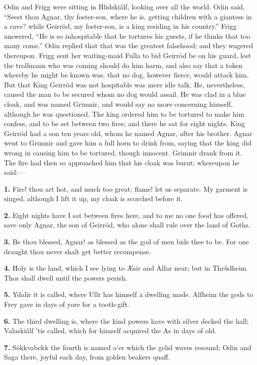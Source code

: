 Odin and Frigg were sitting in Hlidskiâlf, looking over all the world.
Odin said, ``Seest thou Agnar, thy foster-son, where he is, getting
children with a giantess in a cave? while Geirröd, my foster-son, is a
king residing in his country.'' Frigg answered, ``He is so inhospitable
that he tortures his guests, if he thinks that too many come.'' Odin
replied that that was the greatest falsehood; and they wagered
thereupon. Frigg sent her waiting-maid Fulla to bid Geirröd be on his
guard, lest the trollmann who was coming should do him harm, and also
say that a token whereby he might be known was, that no dog, however
fierce, would attack him. But that King Geirröd was not hospitable was
mere idle talk. He, nevertheless, caused the man to be secured whom no
dog would assail. He was clad in a blue cloak, and was named Grimnir,
and would say no more concerning himself, although he was questioned.
The king ordered him to be tortured to make him confess, and to be set
between two fires; and there he sat for eight nights. King Geirröd had
a son ten years old, whom he named Agnar, after his brother. Agnar
went to Grimnir and gave him a full horn to drink from, saying that
the king did wrong in causing him to be tortured, though innocent.
Grimnir drank from it. The fire had then so approached him that his
cloak was burnt; whereupon he said:—

\textbf{1.} Fire! thou art hot, and much too great; flame! let us separate.
My garment is singed, although I lift it up, my cloak is scorched
before it.

\textbf{2.} Eight nights have I sat between fires here, and to me no one food
has offered, save only Agnar, the son of Geirröd, who alone shall rule
over the land of Goths.

\textbf{3.} Be thou blessed, Agnar! as blessed as the god of men bids thee to
be. For one draught thou never shalt get better recompense.

\textbf{4.} Holy is the land, which I see lying to Æsir and Alfar near; but
in Thrûdheim Thor shall dwell until the powers perish.

\textbf{5.} Ydalir it is called, where Ullr has himself a dwelling made.
Alfheim the gods to Frey gave in days of yore for a tooth-gift.

\textbf{6.} The third dwelling is, where the kind powers have with silver
decked the hall; Valaskiâlf 'tis called, which for himself acquired
the As in days of old.

\textbf{7.} Sökkvabekk the fourth is named o'er which the gelid waves
resound; Odin and Saga there, joyful each day, from golden beakers
quaff.

